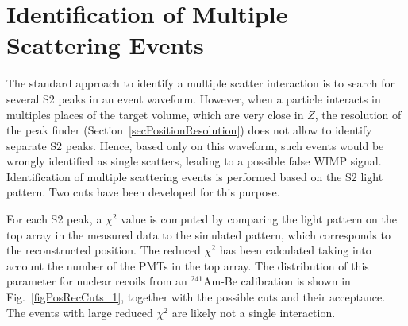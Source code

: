 \section{Identification of Multiple Scattering Events }
\label{secPosRecCuts}

The standard approach to identify a multiple scatter interaction is to search for several S2 peaks in an event waveform. However, when a particle interacts in multiples places of the target volume, which are very close in $Z$, the resolution of the peak finder (Section~\ref{secPositionResolution}) does not allow to identify separate S2 peaks. Hence, based only on this waveform, such events would be wrongly identified as single scatters, leading to a possible false WIMP signal. Identification of multiple scattering events is performed based on the S2 light pattern. Two cuts have been developed for this purpose.

For each S2 peak, a $\chi^{2}$ value is computed by comparing the light pattern on the top array in the measured data to the simulated pattern, which corresponds to the reconstructed position. The reduced $\chi^{2}$ has been calculated taking into account the number of the PMTs in the top array. The distribution of this parameter for nuclear recoils from an $^{241}$Am-Be calibration is shown in Fig.~\ref{figPosRecCuts_1}, together with the possible cuts and their acceptance. The events with large reduced $\chi^{2}$ are likely not a single interaction.

